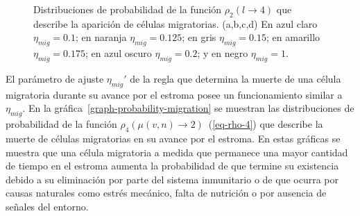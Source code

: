 \begin{figure}[!ht]
\begin{center}
\end{center}\vspace*{-0.5cm}
\caption[Distribuciones de probabilidad de la funci\'on $\rho_2(n_i \rightarrow 4)$ que describe la aparici\'on de c\'elulas migratorias para distintos par\'ametros]{Distribuciones de probabilidad de la funci\'on $\rho_2(l \rightarrow 4)$ que describe la aparici\'on de c\'elulas migratorias. (a,b,c,d) En azul claro $\eta_{mig}=0$.$1$; en naranja $\eta_{mig}=0$.$125$; en gris $\eta_{mig}=0$.$15$; en amarillo $\eta_{mig}=0$.$175$; en azul oscuro $\eta_{mig}=0$.$2$; y en negro $\eta_{mig}=1$.}
\label{graph-probability-aparition}
\end{figure}

El par\'ametro de ajuste $\eta_{mig}'$ de la regla que determina la muerte de una c\'elula migratoria durante su avance por el estroma posee un funcionamiento similar a $\eta_{mig}$. En la gr\'afica~\ref{graph-probability-migration} se muestran las distribuciones de probabilidad de la funci\'on $\rho_4(\mu(v,n) \rightarrow 2)$~(\ref{eq-rho-4}) que describe la muerte de c\'elulas migratorias en su avance por el estroma. En estas gr\'aficas se muestra que una c\'elula migratoria a medida que permanece una mayor cantidad de tiempo en el estroma aumenta la probabilidad de que termine su existencia debido a su eliminaci\'on por parte del sistema inmunitario o de que ocurra por causas naturales como estr\'es mec\'anico, falta de nutrici\'on o por ausencia de se\~nales del entorno.

